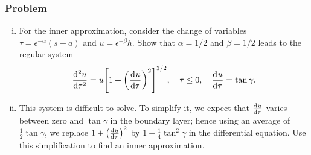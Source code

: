 \documentclass[12pt,twoside]{article}
\begin{document}
\subsubsection*{Problem}
\begin{enumerate}[(i)]
\item For the inner approximation, consider the change of variables
  $\tau=\epsilon^{-\alpha}(s-a)$ and $u=\epsilon^{-\beta}h$. Show that
  $\alpha=1/2$ and $\beta=1/2$ leads to the regular system
  \begin{equation}
    \label{eq:minilab-problem-part-c}
    \od[2]{u}{\tau} = u{\left[ 1+{\left( \od{u}{\tau} \right)}^2 \right]}^{3/2},
    \quad \tau\le0,\quad \od{u}{\tau}=\tan\gamma.
  \end{equation}

\item This system is difficult to solve. To simplify it, we expect that
  $\frac{\mathrm{d}^{} {u}}{\mathrm{d}{\tau}^{}}$ varies between zero and $\tan\gamma$ in the boundary layer;
  hence using an average of $\frac{1}{2}\tan\gamma$, we replace
  $1+{\left(\frac{\mathrm{d}^{} {u}}{\mathrm{d}{\tau}^{}}\right)}^2$ by $1+\frac{1}{4}\tan^2\gamma$ in the
  differential equation. Use this simplification to find an inner approximation.
\end{enumerate}
\end{document}
